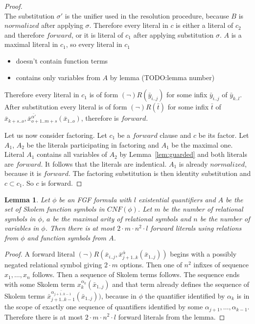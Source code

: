 \documentclass[english, shortabstract]{iithesis}
\theoremstyle{definition} \newtheorem{definition}{Definition}[chapter]
\theoremstyle{remark} \newtheorem{remark}[definition]{Observation}
\theoremstyle{plain} \newtheorem{theorem}[definition]{Theorem}
\theoremstyle{plain} \newtheorem{lemma}[definition]{Lemma}
\begin{document}
\begin{proof}
\begin{equation}
\end{equation}
The substitution $\sigma'$ is the unifier used in the resolution procedure, because $B$ is $normalized$ after applying $\sigma$.
Therefore every literal in $c$ is either a literal of $c_2$ and therefore $forward$, or it is 
literal of $c_1$ after applying substitution $\sigma$.
$A$ is a maximal literal in $c_1$, so every literal in $c_1$ 
\begin{itemize}
    \item doesn't contain function terms
    \item contains only variables from $A$ by lemma (TODO:lemma number)
\end{itemize}
Therefore every literal in $c_1$ is of form $(\lnot)R(\bar{y}_{i..j})$ for some infix $\bar{y}_{i..j}$ of $\bar{y}_{k..l}$.
After substitution every literal is of form $(\lnot)R(\bar{t})$ for some infix $\bar{t}$ of $\bar{x}_{k+s..o}, \bar{x}^{\bar{\alpha'}}_{{o+1..m+s}}(\bar{x}_{1..o})$, therefore is $forward$.

\par Let us now consider factoring. Let $c_1$ be a $forward$ clause and $c$ be its factor.
Let $A_1$, $A_2$ be the literals participating in factoring and $A_1$ be the maximal one.
Literal $A_1$ contains all variables of $A_2$ by Lemma~\ref{lem:guarded} and both literals are $forward$. 
It follows that the literals are indentical. $A_1$ is already $normalized$, because it is $forward$.
The factoring substitution is then identity substitution and $c\subset c_1$. So $c$ is forward.
\end{proof}

\begin{lemma}
Let $\phi$ be an FGF formula with $l$ existential quantifiers and 
$A$ be the set of Skolem function symbols in $CNF(\phi)$.
Let $m$ be the number of relational symbols in $\phi$, $a$ be the maximal arity
of relational symbols and $n$ be the number of variables in $\phi$. 
Then there is at most $2\cdot m \cdot n^2 \cdot l$ forward literals using relations from $\phi$ and function symbols from $A$.
\end{lemma}
\begin{proof}
A forward literal $(\lnot)R(\bar{x}_{i..j}, \bar{x}^{\bar{\alpha}}_{{j+1..k}}(\bar{x}_{1..j}))$
begins with a possibly negated relational symbol giving $2\cdot m$ options. 
Then one of $n^2$ infixes of sequence $x_1, \dots, x_n$ follows.
Then a sequence of Skolem terms follows.
The sequence ends with some Skolem term $x^{\alpha_k}_k(\bar{x}_{1..j})$ and that term 
already defines the sequence of Skolem terms $\bar{x}^{\bar{\alpha_{j+1..k-1}}}_{{j+1..k-1}}(\bar{x}_{1..j}))$,
because in $\phi$ the quantifier identified by $\alpha_k$ is in the scope of exactly one sequence of quantifiers identified by some $\alpha_{j+1},\dots, \alpha_{k-1}$.
Therefore there is at most $2\cdot m \cdot n^2 \cdot l$ forward literals from the lemma.
\end{proof}
\end{document}
